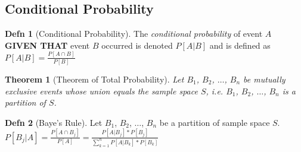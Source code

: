 \documentclass[10pt,letterpaper,final,twoside,notitlepage]{article}
\theoremstyle{plain}
\newtheorem{theorem}{Theorem}
\theoremstyle{definition}
\newtheorem{definition}{Defn}
\begin{document}
	\subsection{Conditional Probability} \label{subsec:Conditional Probability}
		\begin{definition}[Conditional Probability] \label{def:Conditional Probability}
			The \emph{conditional probability} of event $A$ \textbf{GIVEN THAT} event $B$ occurred is denoted $P \left[ A \vert B \right]$ and is defined as $P \left[ A \vert B \right] = \frac{P \left[ A \cap B \right]}{P \left[ B \right]}$
		\end{definition}
		\begin{theorem}[Theorem of Total Probability]
			Let $B_{1}$, $B_{2}$, $\ldots$, $B_{n}$ be mutually exclusive events whose union equals the sample space $S$, i.e. $B_{1}$, $B_{2}$, $\ldots$, $B_{n}$ is a \emph{partition of $S$}.
		\end{theorem}
		\begin{definition}[Baye's Rule]
			Let $B_{1}$, $B_{2}$, $\ldots$, $B_{n}$ be a partition of sample space $S$.
			$P \left[ B_{j} \vert A \right] = \frac{P \left[ A \cap B_{j} \right]}{P \left[ A \right]} = \frac{P \left[ A \vert B_{j} \right] * P \left[ B_{j} \right]}{\sum_{k=1}^{n} P \left[ A \vert B_{k} \right] * P \left[ B_{k} \right]}$
		\end{definition}
\end{document}
